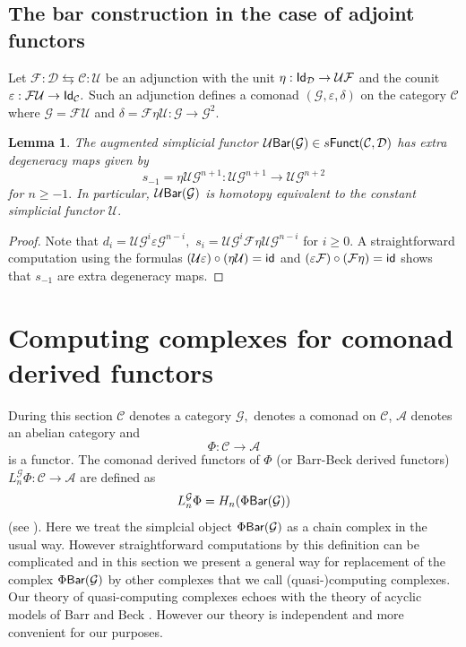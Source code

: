 \documentclass{amsart}
\numberwithin{equation}{section}
\newtheorem{lemma}[theorem]{Lemma}
\theoremstyle{definition}
\def\CC{\mathcal{C}}
\def\FF{\mathcal{F}}
\def\GG{\mathcal{G}}
\def\UU{\mathcal{U}}
\def\DD{\mathcal{D}}
\def\AA{\mathcal{A}}
\begin{document}
\subsection{The bar construction in the case of adjoint functors}

Let $\FF:\DD\leftrightarrows \CC: \UU$ be an adjunction with the unit $\eta:{\sf Id}_\DD\to \UU\FF$ and the counit $\varepsilon:\FF \UU\to {\sf Id}_\CC.$  Such an adjunction defines a comonad $(\GG, \varepsilon,\delta)$ on the category $\CC$ where $\GG=\FF\UU$ and $ \delta= \FF \eta\UU:\GG\to \GG^2.$ 

\begin{lemma}\label{lemma_extra} The augmented simplicial functor $\UU{\sf Bar}(\GG)\in s{\sf Funct}(\CC,\DD)$ has extra degeneracy maps given by 
$$s_{-1}=\eta \UU \GG^{n+1} : \UU\GG^{n+1}\to \UU\GG^{n+2}$$ 
for $n\geq -1.$ In particular, $\UU{\sf Bar}(\GG)$ is homotopy equivalent to the constant simplicial functor $\UU.$
\end{lemma}
\begin{proof} Note that 
 $ d_i=\UU\GG^i \varepsilon  \GG^{n-i},$ $ s_i=\UU\GG^i \FF\eta\UU  \GG^{n-i}$ for $i\geq 0.$ A straightforward computation using the formulas  $(\UU \varepsilon) \circ (\eta \UU)={\sf id}$ and $(\varepsilon \FF)\circ (\FF \eta)={\sf id}$ shows that $s_{-1}$ are extra degeneracy maps. 
\end{proof}



\section{Computing complexes for comonad derived functors}

During this section $\CC$ denotes a category $\GG,$ denotes a comonad on $\CC$, $\AA$ denotes an abelian category and 
$$\Phi:\CC\to \AA$$ 
is a functor. The comonad derived functors of $\Phi$ (or Barr-Beck derived functors)   $L^\GG_n\Phi:\CC\to \AA$ are defined as 
$$L^{\GG}_n\Phi = H_n(\Phi {\sf Bar}(\GG))$$
(see \cite{barr1969homology}).
Here we treat the simplcial object $\Phi {\sf Bar}(\GG)$ as a chain complex in the usual way. However straightforward computations by this definition can be complicated and in this section we present a general way for replacement of the complex $\Phi{\sf Bar}(\GG)$ by other complexes that we call (quasi-)computing complexes. Our theory of quasi-computing complexes echoes with the theory of acyclic models of Barr and Beck \cite{barr1966acyclic}. However our theory is independent and more convenient for our purposes. 
\end{document}

